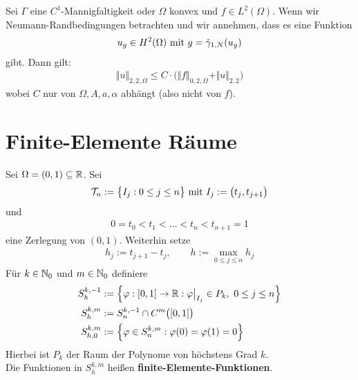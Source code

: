 \begin{theorem}[Regularität]\label{theorem3.3}\enter
	Sei $\Gamma$ eine $C^1$-Mannigfaltigkeit oder $\Omega$ konvex und $f\in L^2(\Omega)$. Wenn wir Neumann-Randbedingungen betrachten und wir annehmen, dass es eine Funktion 
\begin{align*}
u_g\in H^2(\Omega)\mit g=\tilde{\gamma}_{1,N}(u_g)
\end{align*}
gibt. Dann gilt:
\begin{align*}
\Vert u\Vert_{2,2,\Omega}\leq C\cdot\Big(\Vert f\Vert_{0,2,\Omega}+\Vert u\Vert_{2,2}\Big)
\end{align*}
wobei $C$ nur von $\Omega, A,a,\alpha$ abhängt (also nicht von $f$).
\end{theorem}

\section{Finite-Elemente Räume} %
\begin{definition}\enter
Sei $\Omega=(0,1)\subseteq\R$. Sei
\begin{align*}
\mathcal{T}_n:=\big\lbrace I_j:0\leq j\leq n\big\rbrace\mit I_j:=\big(t_j,t_{j+1}\big)
\end{align*}
und 
\begin{align*}
0=t_0<t_1<\ldots<t_n< t_{n+1}=1
\end{align*}
eine Zerlegung von $(0,1)$. Weiterhin setze
\begin{align*}
h_j:=t_{j+1}-t_j,\qquad h:=\max\limits_{0\leq j\leq n} h_j
\end{align*}
Für $k\in\N_0$ und $m\in\N_0$ definiere
\begin{align*}
S_h^{k,-1}&:=\Big\lbrace\varphi:[0,1]\to\R:\varphi\big|_{I_j}\in P_k,~0\leq j\leq n\Big\rbrace\\
S_h^{k,m}&:=S_n^{k,-1}\cap C^m\big([0,1]\big)\\
S_{h,0}^{k,m}&:=\Big\lbrace\varphi\in S_n^{k,m}:\varphi(0)=\varphi(1)=0\Big\rbrace
\end{align*}
Hierbei ist $P_k$ der Raum der Polynome von höchstens Grad $k$.\\ Die Funktionen in $S_h^{k,m}$ heißen \textbf{finite-Elemente-Funktionen}.
\end{definition}

